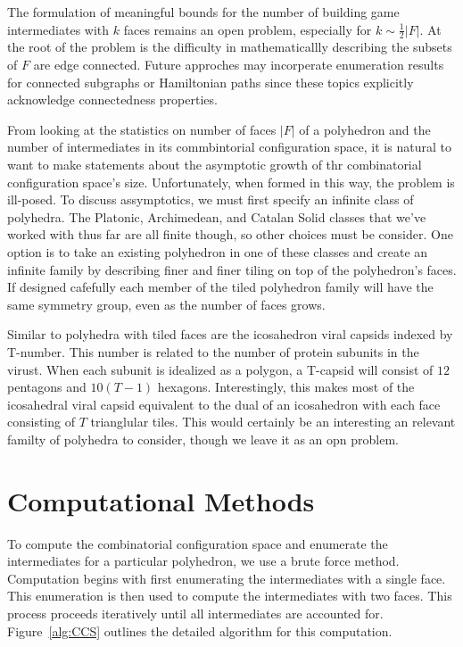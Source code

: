 The formulation of meaningful bounds for the number of building game intermediates with $k$ faces remains an open problem, especially for $k \sim \frac{1}{2}|F|$. At the root of the problem is the difficulty in mathematicallly describing the subsets of $F$ are edge connected. Future approches may incorperate enumeration results for connected subgraphs or Hamiltonian paths since these topics explicitly acknowledge connectedness properties. 

From looking at the statistics on number of faces $|F|$ of a polyhedron and the number of intermediates in its commbintorial configuration space, it is natural to want to make statements about the asymptotic growth of thr combinatorial configuration space's size. Unfortunately, when formed in this way, the problem is ill-posed. To discuss assymptotics, we must first specify an infinite class of polyhedra. The Platonic, Archimedean, and Catalan Solid classes that we've worked with thus far are all finite though, so other choices must be consider. One option is to take an existing polyhedron in one of these classes and create an infinite family by describing finer and finer tiling on top of the polyhedron's faces. If designed cafefully each member of the tiled polyhedron family will have the same symmetry group, even as the number of faces grows. 

Similar to polyhedra with tiled faces are the icosahedron viral capsids indexed by T-number. This number is related to the number of protein subunits in the virust. When each subunit is idealized as a polygon, a T-capsid will consist of $12$ pentagons and $10(T-1)$ hexagons. Interestingly, this makes most of the icosahedral viral capsid equivalent to the dual of an icosahedron with each face consisting of $T$ trianglular tiles. This would certainly be an interesting an relevant familty of polyhedra to consider, though we leave it as an opn problem.

\section{Computational Methods}

To compute the combinatorial configuration space and enumerate the intermediates for a particular polyhedron, we use a brute force method. Computation begins with first enumerating the intermediates with a single face. This enumeration is then used to compute the intermediates with two faces. This process proceeds iteratively until all intermediates are accounted for. Figure~\ref{alg:CCS} outlines the detailed algorithm for this computation. 

